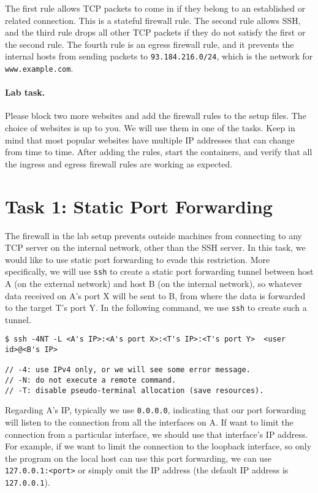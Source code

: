 The first rule allows TCP packets to come in if they belong to
an established or related connection. This is a stateful firewall
rule. The second rule allows SSH, and the third rule drops
all other TCP packets if they do not satisfy the first or the second rule.
The fourth rule is an egress firewall rule, and it prevents the
internal hosts from sending packets to \texttt{93.184.216.0/24},
which is the network for \texttt{www.example.com}.



\paragraph{Lab task.}
Please block two more websites and add the firewall rules to the 
setup files. The choice of websites is up to you. We will use them 
in one of the tasks. Keep in mind that 
most popular websites have multiple IP addresses that can change from time
to time. After adding the rules, start the containers,
and verify that all the ingress and egress firewall rules are working as expected. 



\section{Task 1: Static Port Forwarding} 

The firewall in the lab setup prevents outside machines from connecting to 
any TCP server on the internal network, other than the SSH server. In 
this task, we would like to use static port forwarding to evade this 
restriction. More specifically, we will use \texttt{ssh} to create a static port forwarding tunnel
between host A (on the external network) and host B (on the internal network), 
so whatever data received on A's port X
will be sent to B, from where the data is forwarded to 
the target T's port Y. In the following command, we 
use \texttt{ssh} to create such a tunnel.  

\begin{lstlisting}
$ ssh -4NT -L <A's IP>:<A's port X>:<T's IP>:<T's port Y>  <user id>@<B's IP>

// -4: use IPv4 only, or we will see some error message.
// -N: do not execute a remote command.
// -T: disable pseudo-terminal allocation (save resources).
\end{lstlisting}
 
Regarding A's IP, typically we use \texttt{0.0.0.0}, indicating
that our port forwarding will listen to the connection from all the interfaces on A.
If want to limit the connection from a particular interface, we 
should use that interface's IP address. For example, if we want to 
limit the connection to the loopback interface, so only the program on the 
local host can use this port forwarding, 
we can use \texttt{127.0.0.1:<port>} or simply omit the IP address (the default 
IP address is \texttt{127.0.0.1}).  



